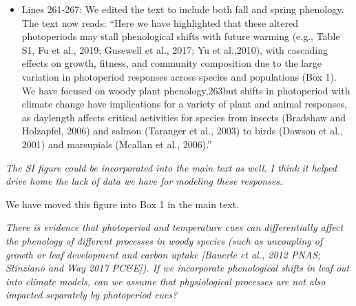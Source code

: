 \documentclass{article}
\begin{document}
\begin{itemize}
\item Lines 261-267: We edited the text to include both fall and spring phenology. The text now reads: ``Here  we  have  highlighted  that  these  altered  photoperiods  may  stall phenological  shifts  with  future  warming  (e.g.,  Table  S1,  Fu  et  al.,  2019;  Gusewell  et  al.,  2017;  Yu  et  al.,2010), with cascading effects on growth,  fitness, and community composition due to the large variation in photoperiod responses across species and populations (Box 1).  We have focused on woody plant phenology,263but shifts in photoperiod with climate change have implications for a variety of plant and animal responses, as daylength affects critical activities for species from insects (Bradshaw and Holzapfel, 2006) and salmon (Taranger et al., 2003) to birds (Dawson et al., 2001) and marsupials (Mcallan et al., 2006).''

\end{itemize}
\par \emph{The SI figure could be incorporated into the main text as well. I think it helped drive home the lack of data we have for modeling these responses.}

\par We have moved this figure into Box 1 in the main text.

\par \emph{There is evidence that photoperiod and temperature cues can differentially affect the phenology of different processes in woody species (such as uncoupling of growth or leaf development and carbon uptake [Bauerle et al., 2012 PNAS; Stinziano and Way 2017 PC\&E]). If we incorporate phenological shifts in leaf out into climate models, can we assume that physiological processes are not also impacted separately by photoperiod cues?} 
\end{document}
